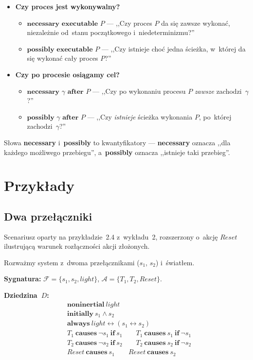 \documentclass[11pt,a4paper]{article}
\newcommand{\causes}{\textbf{causes}}
\newcommand{\aft}{\textbf{after}}
\renewcommand{\iff}{\textbf{if}}
\newcommand{\initially}{\textbf{initially}}
\newcommand{\always}{\textbf{always}}
\newcommand{\noninertial}{\textbf{noninertial}}
\newcommand{\necessary}{\textbf{necessary}}
\newcommand{\possibly}{\textbf{possibly}}
\newcommand{\executable}{\textbf{executable}}
\begin{document}
\begin{itemize}
  \item \textbf{Czy proces jest wykonywalny?}
    \begin{itemize}
      \item $\necessary$ $\executable$ $P$ --- ,,Czy proces $P$ da się zawsze wykonać,
        niezależnie od~stanu początkowego i~niedeterminizmu?''
      \item $\possibly$ $\executable$ $P$ --- ,,Czy istnieje choć jedna ścieżka,
        w~której da się wykonać cały proces $P$?''
    \end{itemize}

  \item \textbf{Czy po procesie osiągamy cel?}
    \begin{itemize}
      \item $\necessary$ $\gamma$ $\aft$ $P$ --- ,,Czy po wykonaniu procesu $P$
        \emph{zawsze} zachodzi~$\gamma$?''
      \item $\possibly$ $\gamma$ $\aft$ $P$ --- ,,Czy \emph{istnieje} ścieżka
        wykonania $P$, po~której zachodzi~$\gamma$?''
    \end{itemize}
\end{itemize}

Słowa \necessary{} i~\possibly{} to kwantyfikatory --- \necessary{} oznacza
,,dla każdego możliwego przebiegu'', a~\possibly{} oznacza ,,istnieje taki przebieg''.

\section{Przykłady}

\subsection{Dwa przełączniki}
\noindent Scenariusz oparty na przykładzie~2.4 z~wykładu~2,
rozszerzony o~akcję $\mathit{Reset}$ ilustrującą warunek rozłączności
akcji złożonych.

Rozważmy system z~dwoma przełącznikami ($s_1$, $s_2$) i~światłem.

\medskip
\noindent\textbf{Sygnatura:}
$\mathcal{F} = \{s_1, s_2, \mathit{light}\}$, \quad
$\mathcal{A} = \{T_1, T_2, \mathit{Reset}\}$.

\medskip
\noindent\textbf{Dziedzina~$D$:}
\begin{align*}
  &\noninertial\ \mathit{light} \\
  &\initially\ s_1 \land s_2 \\
  &\always\ \mathit{light} \leftrightarrow (s_1 \leftrightarrow s_2) \\
  &T_1\ \causes\ \neg s_1\ \iff\ s_1
  \qquad T_1\ \causes\ s_1\ \iff\ \neg s_1 \\
  &T_2\ \causes\ \neg s_2\ \iff\ s_2
  \qquad T_2\ \causes\ s_2\ \iff\ \neg s_2 \\
  &\mathit{Reset}\ \causes\ s_1
  \qquad \mathit{Reset}\ \causes\ s_2
\end{align*}
\end{document}
